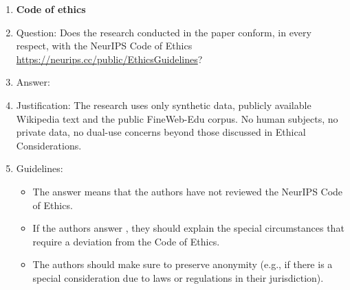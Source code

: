 \documentclass{article}
\begin{document}
\begin{enumerate}
\item {\bf Code of ethics}
    \item[] Question: Does the research conducted in the paper conform, in every respect, with the NeurIPS Code of Ethics \url{https://neurips.cc/public/EthicsGuidelines}?
    \item[] Answer: \answerYes{}
    \item[] Justification: The research uses only synthetic data, publicly available Wikipedia text and the public FineWeb-Edu corpus. No human subjects, no private data, no dual-use concerns beyond those discussed in Ethical Considerations.
    \item[] Guidelines:
    \begin{itemize}
        \item The answer \answerNA{} means that the authors have not reviewed the NeurIPS Code of Ethics.
        \item If the authors answer \answerNo, they should explain the special circumstances that require a deviation from the Code of Ethics.
        \item The authors should make sure to preserve anonymity (e.g., if there is a special consideration due to laws or regulations in their jurisdiction).
    \end{itemize}



\end{enumerate}
\end{document}
